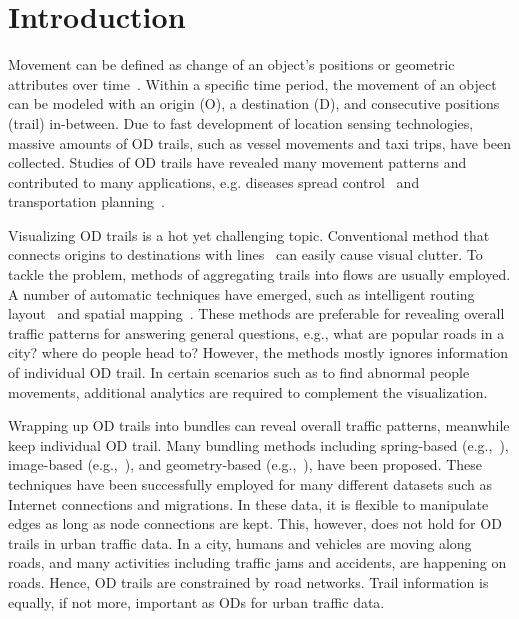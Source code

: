 \section{Introduction}
\label{sec:intro}

Movement can be defined as change of an object's positions or geometric attributes over time~\cite{dodge_2008_towards}.
Within a specific time period, the movement of an object can be modeled with an origin (O), a destination (D), and consecutive positions (trail) in-between.
Due to fast development of location sensing technologies, massive amounts of OD trails, such as vessel movements and taxi trips, have been collected.
Studies of OD trails have revealed many movement patterns and contributed to many applications, e.g. diseases spread control~\cite{brock_2006_scaling} and transportation planning~\cite{wang2012understanding}.

Visualizing OD trails is a hot yet challenging topic.
Conventional method that connects origins to destinations with lines~\cite{tobler_1987_experiments} can easily cause visual clutter.
To tackle the problem, methods of aggregating trails into flows are usually employed.
A number of automatic techniques have emerged, such as intelligent routing layout~\cite{phan2005flow, verbeek_2011_flow} and spatial mapping~\cite{andrienko_spatial_2011-1, guo2014origin}.
These methods are preferable for revealing overall traffic patterns for answering general questions, e.g., what are popular roads in a city? where do people head to?
However, the methods mostly ignores information of individual OD trail.
In certain scenarios such as to find abnormal people movements, additional analytics are required to complement the visualization.

Wrapping up OD trails into bundles can reveal overall traffic patterns, meanwhile keep individual OD trail.
Many bundling methods including spring-based (e.g.,~\cite{holten2009force, selassie2011divided}), image-based (e.g.,~\cite{hurter2012graph, lhuillier2017ffteb}), and geometry-based (e.g.,~\cite{holten2006hierarchical, cui2008geometry}), have been proposed.
These techniques have been successfully employed for many different datasets such as Internet connections and migrations.
In these data, it is flexible to manipulate edges as long as node connections are kept.
This, however, does not hold for OD trails in urban traffic data.
In a city, humans and vehicles are moving along roads, and many activities including traffic jams and accidents, are happening on roads.
Hence, OD trails are constrained by road networks.
Trail information is equally, if not more, important as ODs for urban traffic data.

